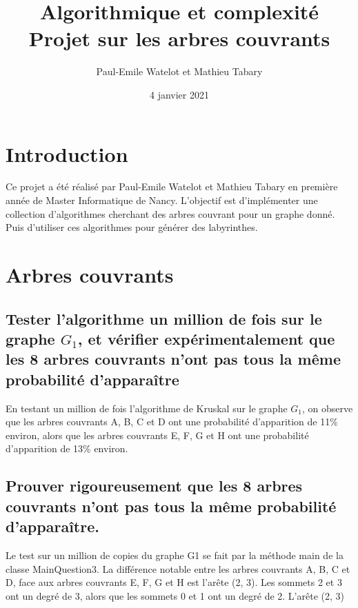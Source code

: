 \documentclass[11pt]{article}
\title{Algorithmique et complexité Projet sur les arbres couvrants}
\author{Paul-Emile Watelot et Mathieu Tabary}
\date{4 janvier 2021}
\begin{document}
    \maketitle
    \newpage
    \tableofcontents
    \newpage

    \section{Introduction}\label{sec:introduction}
        Ce projet a été réalisé par Paul-Emile Watelot et Mathieu Tabary en première année de Master Informatique de Nancy.
        L'objectif est d'implémenter une collection d'algorithmes cherchant des arbres couvrant pour un graphe donné.
        Puis d'utiliser ces algorithmes pour générer des labyrinthes.
    
    \section{Arbres couvrants}\label{sec:arbres-couvrants}
        
        \newpage

        \subsection{Tester l'algorithme un million de fois sur le graphe $G_1$,
        et vérifier expérimentalement que les 8 arbres couvrants n'ont pas tous la même probabilité d'apparaître}\label{subsec:Q3}
            En testant un million de fois l'algorithme de Kruskal sur le graphe $G_1$,
            on observe que les arbres couvrants A, B, C et D ont une probabilité d'apparition de 11\% environ,
            alors que les arbres couvrants E, F, G et H ont une probabilité d'apparition de 13\% environ.

        \subsection{Prouver rigoureusement que les 8 arbres couvrants n'ont pas tous la même probabilité d'apparaître.}\label{subsec:Q4}
            Le test sur un million de copies du graphe G1 se fait par la méthode main de la classe MainQuestion3.
            La différence notable entre les arbres couvrants A, B, C et D, face aux arbres couvrants E, F, G et H est l'arête (2, 3).
            Les sommets 2 et 3 ont un degré de 3, alors que les sommets 0 et 1 ont un degré de 2.
            L'arête (2, 3)
    
\end{document}
